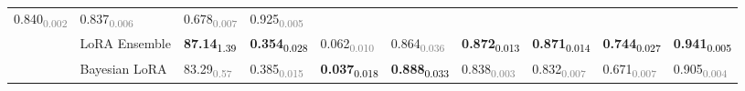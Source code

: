 \begin{table*}[htb]
\begin{tabular}{c|l|*{8}{l}}
0.840\textsubscript{\textcolor{gray}{0.002}} & 0.837\textsubscript{\textcolor{gray}{0.006}} & 
0.678\textsubscript{\textcolor{gray}{0.007}} & 0.925\textsubscript{\textcolor{gray}{0.005}} \\ 
& LoRA Ensemble &  
\textbf{87.14}\textsubscript{\textcolor{black}{1.39}} & \textbf{0.354}\textsubscript{\textcolor{black}{0.028}} & 
0.062\textsubscript{\textcolor{gray}{0.010}} & 0.864\textsubscript{\textcolor{gray}{0.036}} & 
\textbf{0.872}\textsubscript{\textcolor{black}{0.013}} & \textbf{0.871}\textsubscript{\textcolor{black}{0.014}} & 
\textbf{0.744}\textsubscript{\textcolor{black}{0.027}} & \textbf{0.941}\textsubscript{\textcolor{black}{0.005}} \\ 
& Bayesian LoRA & 
83.29\textsubscript{\textcolor{gray}{0.57}} & 0.385\textsubscript{\textcolor{gray}{0.015}} & 
\textbf{0.037}\textsubscript{\textcolor{black}{0.018}} & \textbf{0.888}\textsubscript{\textcolor{black}{0.033}} & 
0.838\textsubscript{\textcolor{gray}{0.003}} & 0.832\textsubscript{\textcolor{gray}{0.007}} & 
0.671\textsubscript{\textcolor{gray}{0.007}} & 0.905\textsubscript{\textcolor{gray}{0.004}} \\ 
\bottomrule
\end{tabular}
\end{table*}


